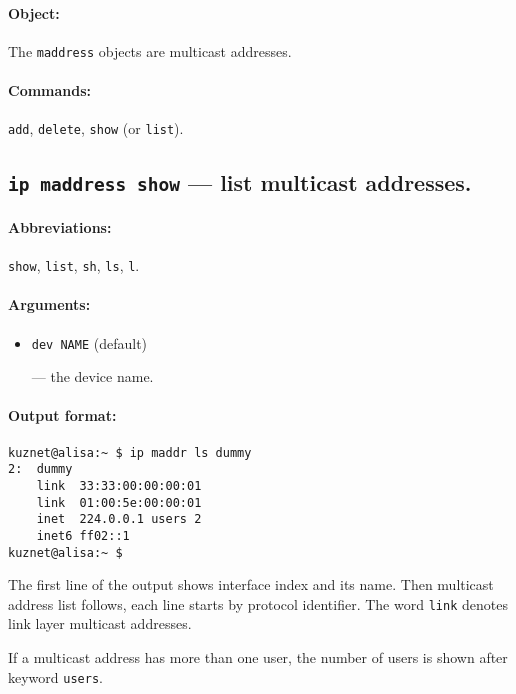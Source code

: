 \paragraph{Object:} The \verb|maddress| objects are multicast addresses.

\paragraph{Commands:} \verb|add|, \verb|delete|, \verb|show| (or \verb|list|).

\subsection{{\tt ip maddress show} --- list multicast addresses.}

\paragraph{Abbreviations:} \verb|show|, \verb|list|, \verb|sh|, \verb|ls|, \verb|l|.

\paragraph{Arguments:}

\begin{itemize}

\item \verb|dev NAME| (default)

--- the device name.

\end{itemize}

\paragraph{Output format:}

\begin{verbatim}
kuznet@alisa:~ $ ip maddr ls dummy
2:  dummy
    link  33:33:00:00:00:01
    link  01:00:5e:00:00:01
    inet  224.0.0.1 users 2
    inet6 ff02::1
kuznet@alisa:~ $ 
\end{verbatim}

The first line of the output shows interface index and its name.
Then multicast address list follows, each line starts by
protocol identifier. The word \verb|link| denotes link layer
multicast addresses.

If a multicast address has more than one user, the number
of users is shown after keyword \verb|users|.

